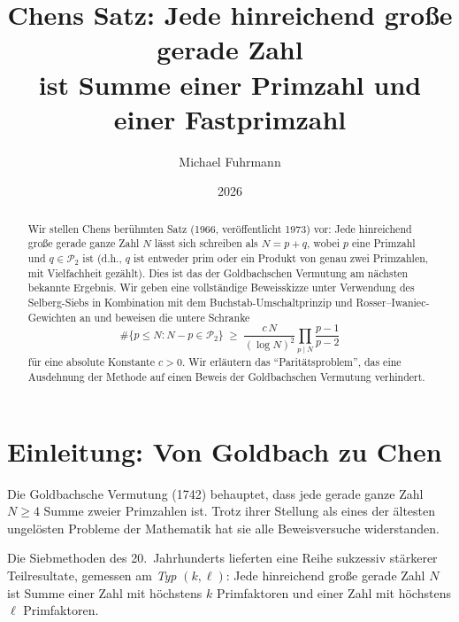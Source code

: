 \documentclass[12pt,a4paper]{amsart}
\theoremstyle{definition}
\newcommand{\Ptwo}{\mathcal{P}_2}
\begin{document}

\title{Chens Satz: Jede hinreichend große gerade Zahl\\
       ist Summe einer Primzahl und einer Fastprimzahl}

\author{Michael Fuhrmann}
\address{Specialist Mathematics Project, Build 56}
\date{2026}

\begin{abstract}
Wir stellen Chens berühmten Satz (1966, veröffentlicht 1973) vor:
Jede hinreichend große gerade ganze Zahl $N$ lässt sich schreiben als
$N = p + q$,
wobei $p$ eine Primzahl und $q \in \Ptwo$ ist (d.h., $q$ ist entweder
prim oder ein Produkt von genau zwei Primzahlen, mit Vielfachheit gezählt).
Dies ist das der Goldbachschen Vermutung am nächsten bekannte Ergebnis.
Wir geben eine vollständige Beweisskizze unter Verwendung des Selberg-Siebs
in Kombination mit dem Buchstab-Umschaltprinzip und Rosser--Iwaniec-Gewichten
an und beweisen die untere Schranke
\[
  \#\bigl\{p \leq N : N - p \in \Ptwo\bigr\}
  \;\geq\;
  \frac{c\, N}{(\log N)^2}\prod_{p \mid N}\frac{p-1}{p-2}
\]
für eine absolute Konstante $c > 0$.  Wir erläutern das ``Paritätsproblem'',
das eine Ausdehnung der Methode auf einen Beweis der Goldbachschen Vermutung
verhindert.
\end{abstract}

\maketitle
\tableofcontents

\section{Einleitung: Von Goldbach zu Chen}

Die Goldbachsche Vermutung (1742) behauptet, dass jede gerade ganze Zahl
$N \geq 4$ Summe zweier Primzahlen ist.  Trotz ihrer Stellung als eines der
ältesten ungelösten Probleme der Mathematik hat sie alle Beweisversuche
widerstanden.

Die Siebmethoden des 20.~Jahrhunderts lieferten eine Reihe sukzessiv
stärkerer Teilresultate, gemessen am \emph{Typ} $(k, \ell)$: Jede hinreichend
große gerade Zahl $N$ ist Summe einer Zahl mit höchstens $k$ Primfaktoren
und einer Zahl mit höchstens $\ell$ Primfaktoren.
\end{document}
